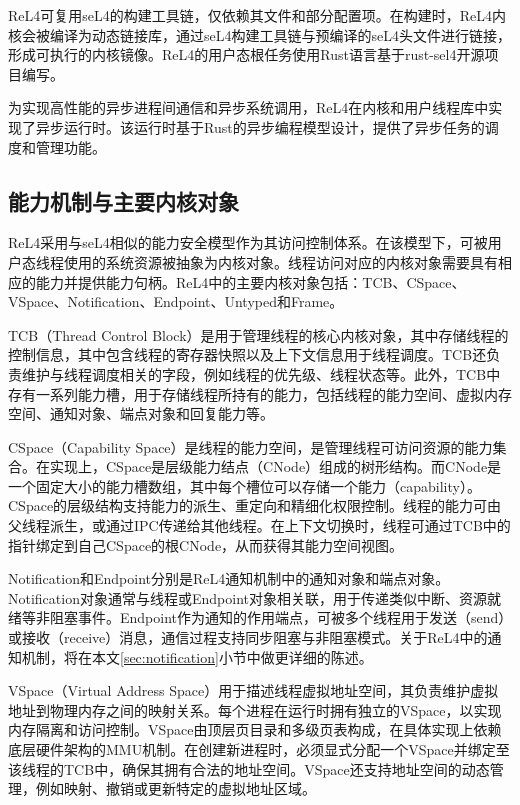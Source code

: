 ReL4可复用seL4的构建工具链，仅依赖其文件和部分配置项。在构建时，ReL4内核会被编译为动态链接库，通过seL4构建工具链与预编译的seL4头文件进行链接，形成可执行的内核镜像。ReL4的用户态根任务使用Rust语言基于rust-sel4开源项目编写。

为实现高性能的异步进程间通信和异步系统调用，ReL4在内核和用户线程库中实现了异步运行时。该运行时基于Rust的异步编程模型设计，提供了异步任务的调度和管理功能。

\subsection{能力机制与主要内核对象}

ReL4采用与seL4相似的能力安全模型作为其访问控制体系。在该模型下，可被用户态线程使用的系统资源被抽象为内核对象。线程访问对应的内核对象需要具有相应的能力并提供能力句柄。ReL4中的主要内核对象包括：TCB、CSpace、VSpace、Notification、Endpoint、Untyped和Frame。


TCB（Thread Control Block）是用于管理线程的核心内核对象，其中存储线程的控制信息，其中包含线程的寄存器快照以及上下文信息用于线程调度。TCB还负责维护与线程调度相关的字段，例如线程的优先级、线程状态等。此外，TCB中存有一系列能力槽，用于存储线程所持有的能力，包括线程的能力空间、虚拟内存空间、通知对象、端点对象和回复能力等。


CSpace（Capability Space）是线程的能力空间，是管理线程可访问资源的能力集合。在实现上，CSpace是层级能力结点（CNode）组成的树形结构。而CNode是一个固定大小的能力槽数组，其中每个槽位可以存储一个能力（capability）。CSpace的层级结构支持能力的派生、重定向和精细化权限控制。线程的能力可由父线程派生，或通过IPC传递给其他线程。在上下文切换时，线程可通过TCB中的指针绑定到自己CSpace的根CNode，从而获得其能力空间视图。


Notification和Endpoint分别是ReL4通知机制中的通知对象和端点对象。Notification对象通常与线程或Endpoint对象相关联，用于传递类似中断、资源就绪等非阻塞事件。Endpoint作为通知的作用端点，可被多个线程用于发送（send）或接收（receive）消息，通信过程支持同步阻塞与非阻塞模式。关于ReL4中的通知机制，将在本文\ref{sec:notification}小节中做更详细的陈述。


VSpace（Virtual Address Space）用于描述线程虚拟地址空间，其负责维护虚拟地址到物理内存之间的映射关系。每个进程在运行时拥有独立的VSpace，以实现内存隔离和访问控制。VSpace由顶层页目录和多级页表构成，在具体实现上依赖底层硬件架构的MMU机制。在创建新进程时，必须显式分配一个VSpace并绑定至该线程的TCB中，确保其拥有合法的地址空间。VSpace还支持地址空间的动态管理，例如映射、撤销或更新特定的虚拟地址区域。


